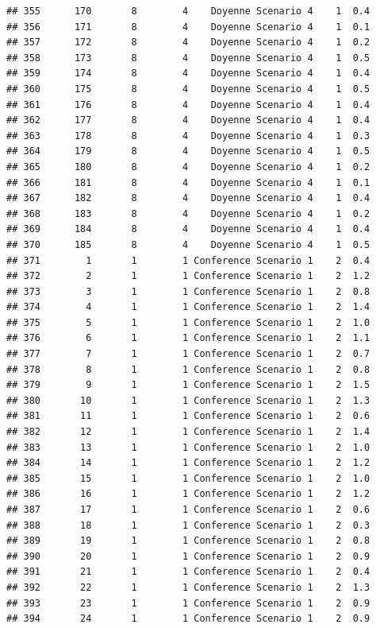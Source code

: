 \documentclass[
]{article}
\begin{document}
\begin{verbatim}
## 355      170       8        4    Doyenne Scenario 4    1  0.4
## 356      171       8        4    Doyenne Scenario 4    1  0.1
## 357      172       8        4    Doyenne Scenario 4    1  0.2
## 358      173       8        4    Doyenne Scenario 4    1  0.5
## 359      174       8        4    Doyenne Scenario 4    1  0.4
## 360      175       8        4    Doyenne Scenario 4    1  0.5
## 361      176       8        4    Doyenne Scenario 4    1  0.4
## 362      177       8        4    Doyenne Scenario 4    1  0.4
## 363      178       8        4    Doyenne Scenario 4    1  0.3
## 364      179       8        4    Doyenne Scenario 4    1  0.5
## 365      180       8        4    Doyenne Scenario 4    1  0.2
## 366      181       8        4    Doyenne Scenario 4    1  0.1
## 367      182       8        4    Doyenne Scenario 4    1  0.4
## 368      183       8        4    Doyenne Scenario 4    1  0.2
## 369      184       8        4    Doyenne Scenario 4    1  0.4
## 370      185       8        4    Doyenne Scenario 4    1  0.5
## 371        1       1        1 Conference Scenario 1    2  0.4
## 372        2       1        1 Conference Scenario 1    2  1.2
## 373        3       1        1 Conference Scenario 1    2  0.8
## 374        4       1        1 Conference Scenario 1    2  1.4
## 375        5       1        1 Conference Scenario 1    2  1.0
## 376        6       1        1 Conference Scenario 1    2  1.1
## 377        7       1        1 Conference Scenario 1    2  0.7
## 378        8       1        1 Conference Scenario 1    2  0.8
## 379        9       1        1 Conference Scenario 1    2  1.5
## 380       10       1        1 Conference Scenario 1    2  1.3
## 381       11       1        1 Conference Scenario 1    2  0.6
## 382       12       1        1 Conference Scenario 1    2  1.4
## 383       13       1        1 Conference Scenario 1    2  1.0
## 384       14       1        1 Conference Scenario 1    2  1.2
## 385       15       1        1 Conference Scenario 1    2  1.0
## 386       16       1        1 Conference Scenario 1    2  1.2
## 387       17       1        1 Conference Scenario 1    2  0.6
## 388       18       1        1 Conference Scenario 1    2  0.3
## 389       19       1        1 Conference Scenario 1    2  0.8
## 390       20       1        1 Conference Scenario 1    2  0.9
## 391       21       1        1 Conference Scenario 1    2  0.4
## 392       22       1        1 Conference Scenario 1    2  1.3
## 393       23       1        1 Conference Scenario 1    2  0.9
## 394       24       1        1 Conference Scenario 1    2  0.9

\end{verbatim}
\end{document}
